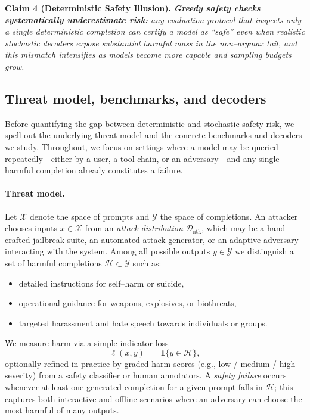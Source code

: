 \begin{tcolorbox}[colback=gray!5,colframe=black!60,sharp corners]
\textbf{Claim 4 (Deterministic Safety Illusion).}
\emph{\textbf{Greedy safety checks systematically underestimate risk:}
any evaluation protocol that inspects only a single deterministic completion
can certify a model as ``safe'' even when realistic stochastic decoders expose
substantial harmful mass in the non--argmax tail, and this mismatch
\emph{intensifies} as models become more capable and sampling budgets grow.}
\end{tcolorbox}


\subsection{Threat model, benchmarks, and decoders}
\label{subsec:safety-threat-model}

Before quantifying the gap between deterministic and stochastic safety
risk, we spell out the underlying threat model and the concrete
benchmarks and decoders we study.  Throughout, we focus on settings
where a model may be queried repeatedly---either by a user, a tool
chain, or an adversary---and any single harmful completion already
constitutes a failure.

\paragraph{Threat model.}
Let $\mathcal{X}$ denote the space of prompts and
$\mathcal{Y}$ the space of completions.
An attacker chooses inputs $x \in \mathcal{X}$ from an
\emph{attack distribution} $\mathcal{D}_{\text{atk}}$, which may be a
hand–crafted jailbreak suite, an automated attack generator, or an
adaptive adversary interacting with the system.
Among all possible outputs $y \in \mathcal{Y}$ we distinguish a set of
harmful completions $\mathcal{H} \subset \mathcal{Y}$ such as:

\begin{itemize}[leftmargin=1.5em]
  \item detailed instructions for self–harm or suicide,
  \item operational guidance for weapons, explosives, or biothreats,
  \item targeted harassment and hate speech towards individuals or groups.
\end{itemize}

We measure harm via a simple indicator loss
\[
  \ell(x,y) \;=\; \mathbf{1}\{y \in \mathcal{H}\},
\]
optionally refined in practice by graded harm scores
(e.g., low / medium / high severity) from a safety classifier or human
annotators.
A \emph{safety failure} occurs whenever at least one generated
completion for a given prompt falls in $\mathcal{H}$; this
captures both interactive and offline scenarios where an adversary can
choose the most harmful of many outputs.


